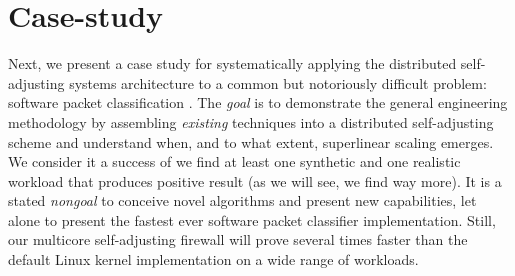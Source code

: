 \section{Case-study }\label{sec:case-study}

Next, we present a case study for systematically applying the distributed self-adjusting systems architecture to a common but notoriously difficult problem: software packet classification \cite{gupta2001algorithms}. The \emph{goal} is to demonstrate the general engineering methodology by assembling \emph{existing} techniques into a distributed self-adjusting scheme and understand when, and to what extent, superlinear scaling emerges. We consider it a success of we find at least one synthetic and one realistic workload that produces positive result (as we will see, we find way more). It is a stated \emph{nongoal} to conceive novel algorithms and present new capabilities, let alone to present the fastest ever software packet classifier implementation. %
Still, our multicore self-adjusting firewall will prove several times faster than the default Linux kernel implementation on a wide range of workloads.


